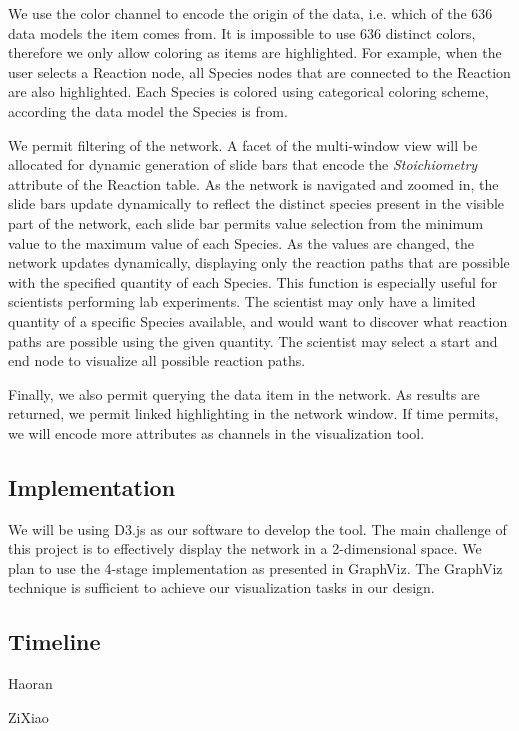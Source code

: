 \documentclass[12pt]{article}
\begin{document}
We use the color channel to encode the origin of the data, i.e. which of the 636 data models the item comes from. It is impossible to use 636 distinct colors, therefore we only allow coloring as items are highlighted. For example, when the user selects a Reaction node, all Species nodes that are connected to the Reaction are also highlighted. Each Species is colored using categorical coloring scheme, according the data model the Species is from.

We permit filtering of the network. A facet of the multi-window view will be allocated for dynamic generation of slide bars that encode the \emph{Stoichiometry} attribute of the Reaction table. As the network is navigated and zoomed in, the slide bars update dynamically to reflect the distinct species present in the visible part of the network, each slide bar permits value selection from the minimum value to the maximum value of each Species. As the values are changed, the network updates dynamically, displaying only the reaction paths that are possible with the specified quantity of each Species. This function is especially useful for scientists performing lab experiments. The scientist may only have a limited quantity of a specific Species available, and would want to discover what reaction paths are possible using the given quantity. The scientist may select a start and end node to visualize all possible reaction paths.

Finally, we also permit querying the data item in the network. As results are returned, we permit linked highlighting in the network window. If time permits, we will encode more attributes as channels in the visualization tool.

\subsection*{Implementation}
We will be using D3.js as our software to develop the tool. The main challenge of this project is to effectively display the network in a 2-dimensional space. We plan to use the 4-stage implementation as presented in GraphViz. The GraphViz technique is sufficient to achieve our visualization tasks in our design.

\subsection*{Timeline}
Haoran

ZiXiao
\end{document}
